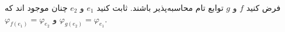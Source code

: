 فرض کنید $f$ و $g$ توابع تام محاسبه‌پذیر باشند. ثابت کنید $e_1$ و $e_2$ چنان موجود اند که \\ $\varphi_{f(e_1)} = \varphi_{e_2}$ و $\varphi_{g(e_2)} = \varphi_{e_1}$.